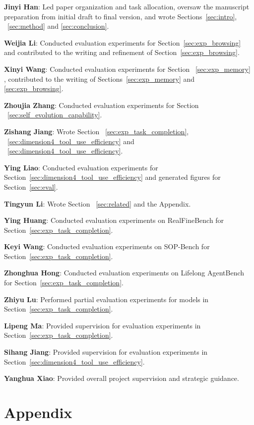 \documentclass[]{kw_latex_template}
\begin{document}
\noindent\textbf{Jinyi Han}: Led paper organization and task allocation, oversaw the manuscript preparation from initial draft to final version, and wrote Sections~\ref{sec:intro}, ~\ref{sec:method} and \ref{sec:conclusion}.

\noindent\textbf{Weijia Li}: Conducted evaluation experiments for Section~\ref{sec:exp_browsing} and contributed to the writing and refinement of Section~\ref{sec:exp_browsing}.

\noindent\textbf{Xinyi Wang}: Conducted evaluation experiments for Section ~\ref{sec:exp_memory} , contributed to the writing of Sections~\ref{sec:exp_memory} and \ref{sec:exp_browsing}.

\noindent\textbf{Zhoujia Zhang}: Conducted evaluation experiments for Section ~\ref{sec:self_evolution_capability}.

\noindent\textbf{Zishang Jiang}: Wrote Section ~\ref{sec:exp_task_completion}, ~\ref{sec:dimension4_tool_use_efficiency} and ~\ref{sec:dimension4_tool_use_efficiency}.

\noindent\textbf{Ying Liao}: Conducted evaluation experiments for Section~\ref{sec:dimension4_tool_use_efficiency} and generated figures for Section~\ref{sec:eval}.

\noindent\textbf{Tingyun Li}: Wrote Section ~\ref{sec:related} and the Appendix.

\noindent\textbf{Ying Huang}: Conducted evaluation experiments on RealFineBench for Section~\ref{sec:exp_task_completion}.

\noindent\textbf{Keyi Wang}: Conducted evaluation experiments on SOP-Bench for Section~\ref{sec:exp_task_completion}.

\noindent\textbf{Zhonghua Hong}: Conducted evaluation experiments on Lifelong AgentBench for Section~\ref{sec:exp_task_completion}.

\noindent\textbf{Zhiyu Lu}: Performed partial evaluation experiments for models in Section~\ref{sec:exp_task_completion}.

\noindent\textbf{Lipeng Ma}: Provided supervision for evaluation experiments in Section~\ref{sec:exp_task_completion}.

\noindent\textbf{Sihang Jiang}: Provided supervision for evaluation experiments in Section~\ref{sec:dimension4_tool_use_efficiency}.

\noindent\textbf{Yanghua Xiao}: Provided overall project supervision and strategic guidance.

\section{Appendix}

\end{document}
